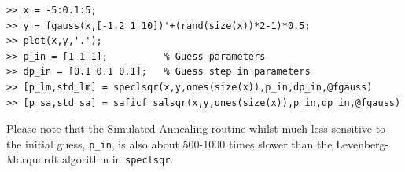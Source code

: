\documentclass[12pt,onecolumn,tightenlines,aps,amsmath,floatfix,notitlepage,nofootinbib]{revtex4}
\begin{document}
\begin{verbatim}
>> x = -5:0.1:5; 
>> y = fgauss(x,[-1.2 1 10])'+(rand(size(x))*2-1)*0.5; 
>> plot(x,y,'.');
>> p_in = [1 1 1];          % Guess parameters
>> dp_in = [0.1 0.1 0.1];   % Guess step in parameters
>> [p_lm,std_lm] = speclsqr(x,y,ones(size(x)),p_in,dp_in,@fgauss)
>> [p_sa,std_sa] = saficf_salsqr(x,y,ones(size(x)),p_in,dp_in,@fgauss)
\end{verbatim}

\noindent Please note that the Simulated Annealing routine whilst much less sensitive to the initial guess, \texttt{p\_in}, is also about 500-1000 times slower than the Levenberg-Marquardt algorithm in \texttt{speclsqr}.




\end{document}
